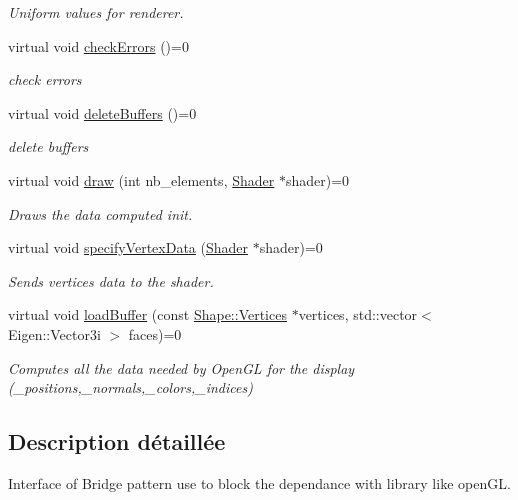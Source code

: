 \begin{DoxyCompactItemize}
\begin{DoxyCompactList}\small\item\em Uniform values for renderer. \end{DoxyCompactList}\item 
virtual void \hyperlink{class_rendering_a93693702cf5a7709a7b1ddc7a7d3d8d3}{check\+Errors} ()=0
\begin{DoxyCompactList}\small\item\em check errors \end{DoxyCompactList}\item 
virtual void \hyperlink{class_rendering_a43cc4c8b7b4d9813773b42c97a7405d5}{delete\+Buffers} ()=0
\begin{DoxyCompactList}\small\item\em delete buffers \end{DoxyCompactList}\item 
virtual void \hyperlink{class_rendering_abeffb3c261cd9b5c6b885aaf8e321ef2}{draw} (int nb\+\_\+elements, \hyperlink{class_shader}{Shader} $\ast$shader)=0
\begin{DoxyCompactList}\small\item\em Draws the data computed init. \end{DoxyCompactList}\item 
virtual void \hyperlink{class_rendering_aecb85f0a1da2d14cde84a918e2636841}{specify\+Vertex\+Data} (\hyperlink{class_shader}{Shader} $\ast$shader)=0
\begin{DoxyCompactList}\small\item\em Sends vertices data to the shader. \end{DoxyCompactList}\item 
virtual void \hyperlink{class_rendering_aa753ed0c94b2ece92afd26a58aef4f79}{load\+Buffer} (const \hyperlink{struct_shape_1_1_vertices}{Shape\+::\+Vertices} $\ast$vertices, std\+::vector$<$ Eigen\+::\+Vector3i $>$ faces)=0
\begin{DoxyCompactList}\small\item\em Computes all the data needed by Open\+GL for the display (\+\_\+positions,\+\_\+normals,\+\_\+colors,\+\_\+indices) \end{DoxyCompactList}\end{DoxyCompactItemize}


\subsection{Description détaillée}
Interface of Bridge pattern use to block the dependance with library like open\+GL. 

